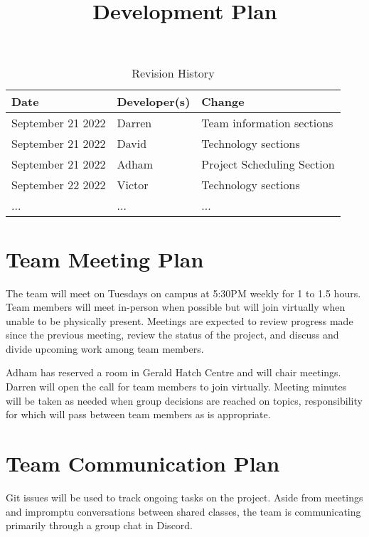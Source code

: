 \documentclass{article}
\title{Development Plan\\\progname}
\author{\authname}
\date{}
\begin{document}
\begin{table}[hp]
\caption{Revision History} \label{TblRevisionHistory}
\begin{tabularx}{\textwidth}{llX}
\toprule
\textbf{Date} & \textbf{Developer(s)} & \textbf{Change}\\
\midrule
September 21 2022 & Darren & Team information sections\\
September 21 2022 & David & Technology sections\\
September 21 2022 & Adham & Project Scheduling Section\\
September 22 2022 & Victor & Technology sections\\
... & ... & ...\\
\bottomrule
\end{tabularx}
\end{table}

\newpage

\maketitle


\section{Team Meeting Plan}

The team will meet on Tuesdays on campus at 5:30PM weekly for 1 to 1.5 hours. Team members will meet in-person when possible but will join virtually when unable to be physically present. Meetings are expected to review progress made since the previous meeting, review the status of the project, and discuss and divide upcoming work among team members.

Adham has reserved a room in Gerald Hatch Centre and will chair meetings. Darren will open the call for team members to join virtually. Meeting minutes will be taken as needed when group decisions are reached on topics, responsibility for which will pass between team members as is appropriate.

\section{Team Communication Plan}

Git issues will be used to track ongoing tasks on the project. Aside from meetings and impromptu conversations between shared classes, the team is communicating primarily through a group chat in Discord.
\end{document}
